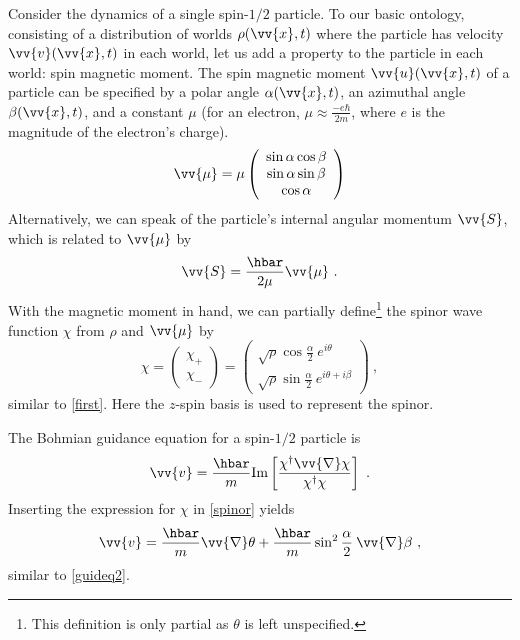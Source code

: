 \documentclass[12pt,secnumarabic,balancelastpage,amsmath,amssymb,nofootinbib]{article}
\begin{document}
Consider the dynamics of a single spin-$1/2$ particle.  To our basic ontology, consisting of a distribution of worlds $\rho(\vv{x},t)$ where the particle has velocity $\vv{v}(\vv{x},t)$ in each world, let us add a property to the particle in each world: spin magnetic moment.  The spin magnetic moment $\vv{u}(\vv{x},t)$ of a particle can be specified by a polar angle $\alpha(\vv{x},t)$, an azimuthal angle $\beta(\vv{x},t)$, and a constant $\mu$ (for an electron, $\mu\approx\frac{-e \hbar}{2 m}$, where $e$ is the magnitude of the electron's charge).
\begin{equation}
\vv{\mu}=\mu \left(\begin{array}{c}\sin\alpha\cos\beta \\ \sin\alpha\sin\beta \\ \cos \alpha \end{array} \right)
\label{mumu}
\end{equation}
Alternatively, we can speak of the particle's internal angular momentum $\vv{S}$, which is related to $\vv{\mu}$ by
\begin{equation}
\vv{S}=\frac{\hbar}{2 \mu} \vv{\mu}\ .
\label{crispy}
\end{equation}
With the magnetic moment in hand, we can partially define\footnote{This definition is only partial as $\theta$ is left unspecified.} the spinor wave function $\chi$ from $\rho$ and $\vv{\mu}$ by
\begin{equation}
\chi=\left(\begin{array}{c}\chi_+ \\ \chi_- \end{array}\right)=\left(\begin{array}{c} \sqrt{\rho}\cos\frac{\alpha}{2} \: e^{i\theta} \\ \sqrt{\rho}\sin\frac{\alpha}{2} \: e^{i\theta+i\beta} \end{array}\right)\ ,
\label{spinor}
\end{equation}
similar to \eqref{first}.  Here the $z$-spin basis is used to represent the spinor.

The Bohmian guidance equation for a spin-$1/2$ particle is
\begin{equation}
\vv{v}=\frac{\hbar}{m}\mbox{Im}\left[\frac{\chi^\dagger \vv{\nabla} \chi}{\chi^\dagger \chi}\right]\ .
\label{}
\end{equation}
Inserting the expression for $\chi$ in \eqref{spinor} yields
\begin{equation}
\vv{v}=\frac{\hbar}{m}\vv{\nabla}\theta+\frac{\hbar}{m}\sin^2\frac{\alpha}{2}\: \vv{\nabla}\beta\ ,
\label{guideq3}
\end{equation}
similar to \eqref{guideq2}.
\end{document}
